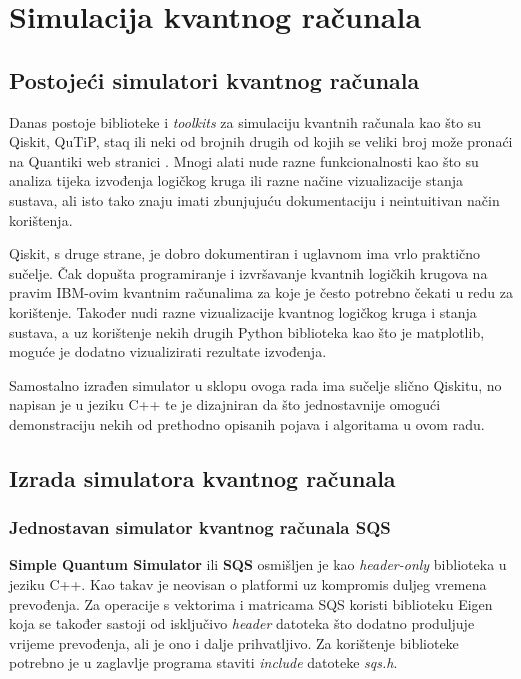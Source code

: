 \chapter{Simulacija kvantnog računala}

\section{Postojeći simulatori kvantnog računala}

Danas postoje biblioteke i \emph{toolkits} za simulaciju kvantnih računala kao što su Qiskit, QuTiP, staq ili neki od brojnih drugih od kojih se veliki broj može pronaći na Quantiki web stranici \citep{simulatori}.  Mnogi alati nude razne funkcionalnosti kao što su analiza tijeka izvođenja logičkog kruga ili razne načine vizualizacije stanja sustava, ali isto tako znaju imati zbunjujuću dokumentaciju i neintuitivan način korištenja.

Qiskit, s druge strane, je dobro dokumentiran i uglavnom ima vrlo praktično sučelje. Čak dopušta programiranje i izvršavanje kvantnih logičkih krugova na pravim IBM-ovim kvantnim računalima za koje je često potrebno čekati u redu za korištenje. Također nudi razne vizualizacije kvantnog logičkog kruga i stanja sustava, a uz korištenje nekih drugih Python biblioteka kao što je matplotlib, moguće je dodatno vizualizirati rezultate izvođenja.

Samostalno izrađen simulator u sklopu ovoga rada ima sučelje slično Qiskitu, no napisan je u jeziku C++ te je dizajniran da što jednostavnije omogući demonstraciju nekih od prethodno opisanih pojava i algoritama u ovom radu.

\section{Izrada simulatora kvantnog računala}

\subsection{Jednostavan simulator kvantnog računala SQS}

\textbf{Simple Quantum Simulator} ili \textbf{SQS}  osmišljen je kao \emph{header-only} biblioteka u jeziku C++. Kao takav je neovisan o platformi uz kompromis duljeg vremena prevođenja. Za operacije s vektorima i matricama SQS koristi biblioteku Eigen \citep{eigen} koja se također sastoji od isključivo \emph{header} datoteka što dodatno produljuje vrijeme prevođenja, ali je ono i dalje prihvatljivo. Za korištenje biblioteke potrebno je u zaglavlje programa staviti \emph{include} datoteke \emph{sqs.h}.

